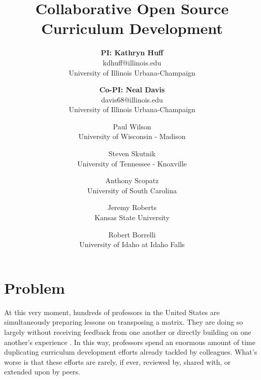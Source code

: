 \documentclass[11pt]{article}
\newcommand{\authorsite}{arfc.npre.illinois.edu}
\begin{document}
          \title{Collaborative Open Source Curriculum Development}
          \author{\textbf{PI: Kathryn Huff}\\
                  kdhuff@illinois.edu\\
                  University of Illinois Urbana-Champaign
                  \and
\textbf{Co-PI: Neal Davis}\\davis68@illinois.edu\\University of Illinois Urbana-Champaign
\and
Paul Wilson\\University of Wisconsin - Madison 
\and
          Steven Skutnik\\University of Tennessee - Knoxville
\and
          Anthony Scopatz\\University of South Carolina 
\and
          Jeremy Roberts\\Kansas State University 
\and
          Robert Borrelli\\University of Idaho at Idaho Falls
}
          \maketitle

          \pagestyle{fancy}
          \lhead{\textcolor{gray}{SIIP Full Proposal}}
          \rhead{\textcolor{gray}{Collaborative Open Source Curriculum Development}}
          \renewcommand{\headrulewidth}{0pt}
          \renewcommand{\footrulewidth}{0pt}

          \section{Problem}
          At this very moment, hundreds of professors in the United States are 
          simultaneously preparing lessons on transposing a matrix.
          They are doing so largely without receiving feedback from one another 
          or directly building on one another's experience 
          \cite{green_building_2014}. In this way, 
          professors spend an enormous amount of time duplicating curriculum 
          development efforts already tackled by colleagues. What's worse is 
          that these efforts are rarely, if ever, reviewed by, shared with, or 
          extended upon by peers.
          
\end{document}
